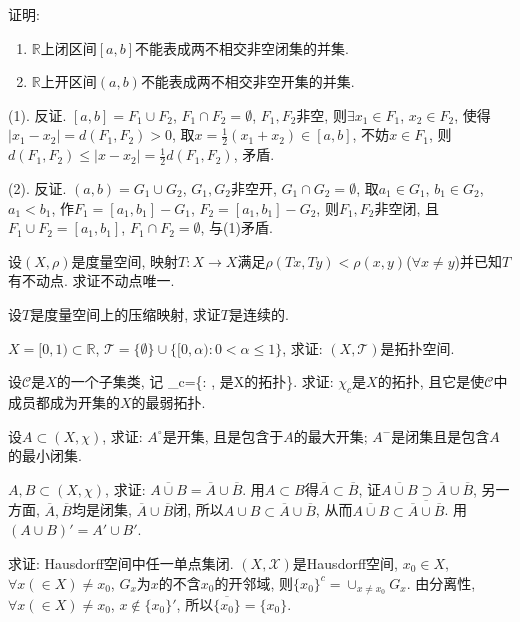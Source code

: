 \bq{}{}
证明:
\begin{enumerate}[(1)]
 \item $\mathbb{R}$上闭区间$[a,b]$不能表成两不相交非空闭集的并集.
 \item $\mathbb{R}$上开区间$(a,b)$不能表成两不相交非空开集的并集.
\end{enumerate}
\eq
\ba
(1). 反证. $[a,b]=F_1\cup F_2$, $F_1\cap F_2=\emptyset$, $F_1, F_2$非空, 则$\exists x_1\in F_1$, $x_2\in F_2$, 
使得$|x_1-x_2|=d(F_1, F_2)>0$, 取$x=\frac{1}{2}(x_1+x_2)\in [a,b]$, 不妨$x\in F_1$, 则$d(F_1, F_2)\le |x-x_2|=\frac12d(F_1, F_2)$,
矛盾.

(2). 反证. $(a,b)=G_1\cup G_2$, $G_1, G_2$非空开, $G_1\cap G_2=\emptyset$, 取$a_1\in G_1$, $b_1\in G_2$, $a_1<b_1$,
作$F_{1}=[a_1, b_1]-G_1$, $F_2=[a_1,b_1]-G_2$, 则$F_1, F_2$非空闭, 且$F_1\cup F_2=[a_1, b_1]$, $F_1\cap F_2=\emptyset$,
与(1)矛盾.
\ea

\bq{}{}
设$(X, \rho)$是度量空间, 映射$T:X\to X$满足$\rho(Tx, Ty)<\rho(x,y)$($\forall x\ne y$)并已知$T$有不动点. 
求证不动点唯一.
\eq

\bq{}{}
设$T$是度量空间上的压缩映射, 求证$T$是连续的.
\eq

\bq{}{}
$X=[0,1)\subset\mathbb{R}$, $\mathscr{T}=\{\emptyset\}\cup\{[0,\alpha): 0<\alpha\le 1\}$, 求证: $(X, \mathscr{T})$是拓扑空间.
\eq

\bq{}{}
设$\mathscr{C}$是$X$的一个子集类, 记
\bee
\chi_c=\cap\{\chi: \subset\chi, \chi\textrm{是}X\textrm{的拓扑}\}.
\eee
求证: $\chi_c$是$X$的拓扑, 且它是使$\mathscr{C}$中成员都成为开集的$X$的最弱拓扑.
\eq

\bq{}{}
设$A\subset(X, \chi)$, 求证: $A^{\circ}$是开集, 且是包含于$A$的最大开集; $A^-$是闭集且是包含$A$的最小闭集.
\eq

\bq{}{}
$A, B\subset(X,\chi)$, 求证: $\overline{A\cup B}=\overline{A}\cup\overline{B}$.
\eq
\ba
用$A\subset B$得$\overline{A}\subset\overline{B}$, 证$\overline{A\cup B}\supset\overline{A}\cup\overline{B}$, 另一方面, $\overline{A}, \overline{B}$均是闭集,
$\overline{A}\cup\overline{B}$闭, 所以$A\cup B\subset\overline{A}\cup\overline{B}$, 从而$\overline{A\cup B}\subset\overline{\overline{A}\cup\overline{B}}$.
\ea
\ba
用$(A\cup B)'=A'\cup B'$.
\ea

求证: Hausdorff空间中任一单点集闭.
\eq
\ba
$(X, \mathscr{X})$是Hausdorff空间, $x_0\in X$, $\forall x(\in X)\ne x_0$, $G_x$为$x$的不含$x_0$的开邻域, 则$\{x_0\}^c=\cup_{x\ne x_0}G_x$.
\ea
\ba
由分离性, $\forall x(\in X)\ne x_0$, $x\notin\{x_0\}'$, 所以$\overline{\{x_0\}}=\{x_0\}$.
\ea

